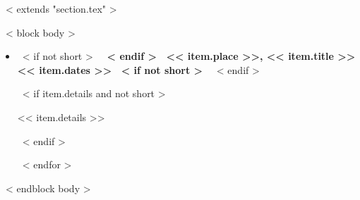 ~< extends "section.tex" >~

~< block body >~
  \begin{itemize}
    ~< for item in items >~
      \item
         ~< if not short >~
            \textbf{
         ~< endif >~
            << item.place >>, << item.title >>\hfill << item.dates >>
         ~< if not short >~
                   }
         ~< endif >~

      ~< if item.details and not short >~
        \begin{small}
            << item.details >>
        \end{small}
      ~< endif >~

    ~< endfor >~
  \end{itemize}
~< endblock body >~
